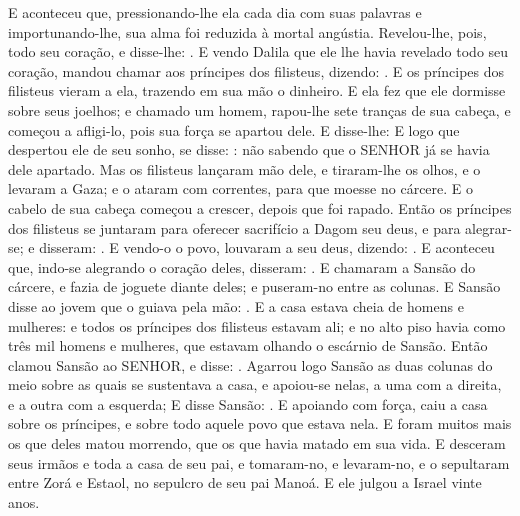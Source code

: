 {  E aconteceu que, pressionando-lhe ela cada dia com suas palavras e importunando-lhe, sua alma foi reduzida à mortal angústia.
  Revelou-lhe, pois, todo seu coração, e disse-lhe: .
  E vendo Dalila que ele lhe havia revelado todo seu coração, mandou chamar aos príncipes dos filisteus, dizendo: . E os príncipes dos filisteus vieram a ela, trazendo em sua mão o dinheiro.
  E ela fez que ele dormisse sobre seus joelhos; e chamado um homem, rapou-lhe sete tranças de sua cabeça, e começou a afligi-lo, pois sua força se apartou dele.
  E disse-lhe:  E logo que despertou ele de seu sonho, se disse: : não sabendo que o SENHOR já se havia dele apartado.
  Mas os filisteus lançaram mão dele, e tiraram-lhe os olhos, e o levaram a Gaza; e o ataram com correntes, para que moesse no cárcere.
  E o cabelo de sua cabeça começou a crescer, depois que foi rapado.
  Então os príncipes dos filisteus se juntaram para oferecer sacrifício a Dagom seu deus, e para alegrar-se; e disseram: .
  E vendo-o o povo, louvaram a seu deus, dizendo: .
  E aconteceu que, indo-se alegrando o coração deles, disseram: . E chamaram a Sansão do cárcere, e fazia de joguete diante deles; e puseram-no entre as colunas.
  E Sansão disse ao jovem que o guiava pela mão: .
  E a casa estava cheia de homens e mulheres: e todos os príncipes dos filisteus estavam ali; e no alto piso havia como três mil homens e mulheres, que estavam olhando o escárnio de Sansão.
  Então clamou Sansão ao SENHOR, e disse: .
  Agarrou logo Sansão as duas colunas do meio sobre as quais se sustentava a casa, e apoiou-se nelas, a uma com a direita, e a outra com a esquerda;
  E disse Sansão: . E apoiando com força, caiu a casa sobre os príncipes, e sobre todo aquele povo que estava nela. E foram muitos mais os que deles matou morrendo, que os que havia matado em sua vida.
  E desceram seus irmãos e toda a casa de seu pai, e tomaram-no, e levaram-no, e o sepultaram entre Zorá e Estaol, no sepulcro de seu pai Manoá. E ele julgou a Israel vinte anos.
\par }

